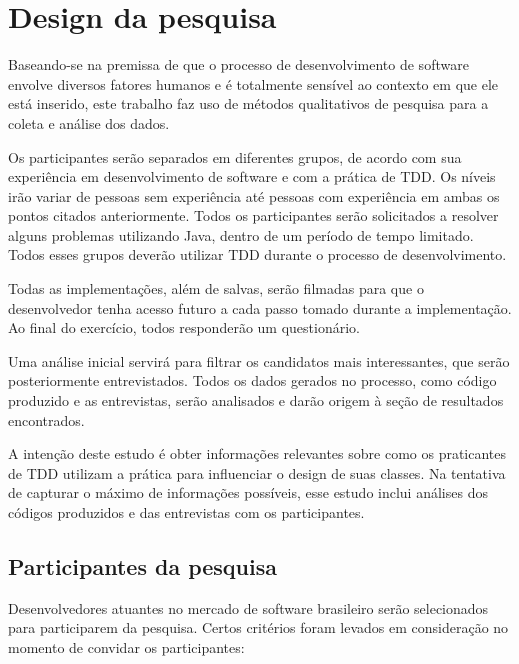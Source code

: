 \section{Design da pesquisa}

Baseando-se na premissa de que o processo de desenvolvimento de software envolve 
diversos fatores humanos e é totalmente sensível ao contexto em que ele está 
inserido, este trabalho faz uso de métodos qualitativos de pesquisa para a coleta e 
análise dos dados.

Os participantes serão separados em diferentes grupos, de acordo com sua
experiência em desenvolvimento de software e com a prática de TDD. Os níveis
irão variar de pessoas sem experiência até pessoas com experiência em ambas
os pontos citados anteriormente.
Todos os participantes serão
solicitados a resolver alguns problemas utilizando Java, dentro de um
período de tempo limitado. Todos esses grupos deverão
utilizar TDD durante o processo de desenvolvimento. 

Todas as implementações,
além de salvas, serão filmadas para que o desenvolvedor tenha acesso futuro
a cada passo tomado durante a implementação.
Ao final do exercício,
todos responderão um questionário.

Uma análise inicial servirá para filtrar os candidatos
mais interessantes, que serão posteriormente entrevistados. 
Todos os dados gerados no processo,
como código produzido e as entrevistas, serão analisados e darão origem
à seção de resultados encontrados.

A intenção deste estudo é obter informações relevantes sobre como os
praticantes de TDD utilizam a prática para influenciar o design de suas
classes. Na tentativa de capturar o máximo de informações possíveis, esse estudo
inclui análises dos códigos produzidos e das entrevistas com os participantes.

\subsection{Participantes da pesquisa}
\label{sec:planejamento-participantes}

Desenvolvedores atuantes no mercado de 
software brasileiro serão selecionados para participarem da pesquisa.
Certos critérios foram levados em consideração no momento de convidar os participantes:

